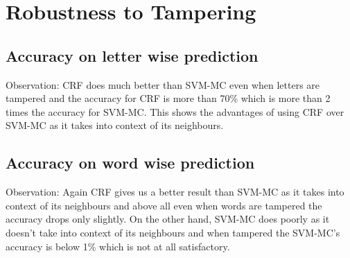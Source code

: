 \documentclass[11pt,a4paper]{article}
\begin{document}
\section{Robustness to Tampering}
\subsection{Accuracy on letter wise prediction}

\begin{center}
\par\end{center}
Observation:
CRF does much better than SVM-MC even when letters are tampered and the accuracy for CRF is more than 70\% which is more than 2 times the accuracy for SVM-MC. This shows the advantages of using CRF over SVM-MC as it takes into context of its neighbours.

\subsection{Accuracy on word wise prediction}

\begin{center}
\par\end{center}
Observation: Again CRF gives us a better result than SVM-MC as it takes into context of its neighbours and above all even when words are tampered the accuracy drops only slightly. On the other hand, SVM-MC does poorly as it doesn't take into context of its neighbours and when tampered the SVM-MC's accuracy is below 1\% which is not at all satisfactory.
\end{document}
